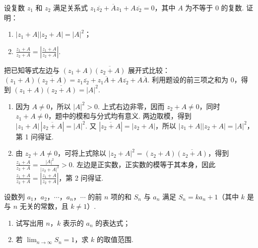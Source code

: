 \begin{problem}
设复数 \(z_1\) 和 \(z_2\) 满足关系式 \(z_1\overline{z_2} + \overline{A}z_1 + A\overline{z_2} = 0\)，其中 \(A\) 为不等于 \(0\) 的复数. 证明：

\begin{enumerate}
\item \(|z_1 + A||z_2 + A| = |A|^2\)；
\item \(\frac{z_1 + A}{z_2 + A} = \left|\frac{z_1 + A}{z_2 + A}\right|\).
\end{enumerate}
\end{problem}

\begin{solution}
把已知等式左边与 \((z_1+A)\overline{(z_2+A)}\) 展开式比较：\((z_1+A)\overline{(z_2+A)}=z_1\overline{z_2}+z_1\overline A+A\overline{z_2}+A\overline A\). 利用题设的前三项之和为 \(0\)，得到 \((z_1+A)\overline{(z_2+A)}=|A|^2\).

\begin{enumerate}
\item 因为 \(A\ne0\)，所以 \(|A|^2>0\). 上式右边非零，因而 \(z_2+A\ne0\)，同时 \(z_1+A\ne0\)，题中的模和与分式均有意义. 两边取模，得到 \(|z_1+A|\,|\overline{z_2+A}|=|A|^2\). 又 \(|\overline{z_2+A}|=|z_2+A|\)，所以 \(|z_1+A||z_2+A|=|A|^2\)，第 1 问得证.

\item 由 \(z_2+A\ne0\)，可将上式除以 \(|z_2+A|^2=(z_2+A)\overline{(z_2+A)}\)，得到 \(\frac{z_1+A}{z_2+A}=\frac{|A|^2}{|z_2+A|^2}>0\). 左边是正实数，正实数的模等于其本身，因此 \(\frac{z_1+A}{z_2+A}=\left|\frac{z_1+A}{z_2+A}\right|\)，第 2 问得证.
\end{enumerate}
\end{solution}

\begin{problem}
设数列 \(a_1\)，\(a_2\)，\(\cdots\)，\(a_n\)，\(\cdots\) 的前 \(n\) 项的和 \(S_n\) 与 \(a_n\) 满足 \(S_n = ka_n + 1\)（其中 \(k\) 是与 \(n\) 无关的常数，且 \(k \neq 1\)）.

\begin{enumerate}
\item 试写出用 \(n\)，\(k\) 表示的 \(a_n\) 的表达式；
\item 若 \(\displaystyle\lim_{n\to\infty}S_n = 1\)，求 \(k\) 的取值范围.
\end{enumerate}
\end{problem}


